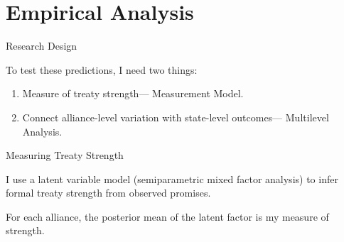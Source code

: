 \documentclass{beamer}
\begin{document}

\section{Empirical Analysis} 


\begin{frame}{Research Design}

To test these predictions, I need two things: 

\pause 
\begin{enumerate} 
\item Measure of treaty strength--- Measurement Model. 
\pause
\item Connect alliance-level variation with state-level outcomes--- Multilevel Analysis.  
\end{enumerate} 


\end{frame}


\begin{frame}{Measuring Treaty Strength}

I use a latent variable model (semiparametric mixed factor analysis) to infer formal treaty strength from observed promises. 

\pause 

For each alliance, the posterior mean of the latent factor is my measure of strength. 



\end{frame} 
\end{document}
